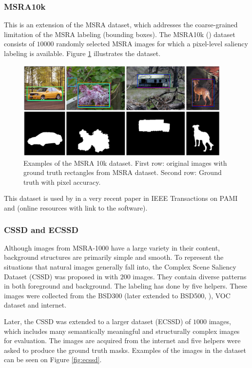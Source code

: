 \subsubsection{MSRA10k}
This is an extension of the MSRA dataset, which  addresses the coarse-grained limitation of the MSRA labeling (bounding boxes). The MSRA10k (\cite{msra10k_db}) dataset consists of $10000$ randomly selected MSRA images for which a pixel-level saliency labeling is available. Figure \ref{fig:msra10k} illustrates the dataset. 
\begin{figure}[H]
\begin{center}
\includegraphics[width=0.95\textwidth]{fig/MSRA10k}
\end{center}
\caption{Examples of the MSRA 10k dataset. First row: original images with ground truth rectangles from MSRA dataset. Second row: Ground truth with pixel accuracy.}
\label{fig:msra10k}
\end{figure}
This dataset is used by in a very recent paper in IEEE Transactions on PAMI \cite{ChengPAMI2015} and \cite{chengPAMIUrl} (online resources with link to the software). 

\subsubsection{CSSD and ECSSD}\label{subsec:cssd}
Although images from MSRA-1000 \cite{LCAV-CONF-2009-012} have a large variety in their content, background structures are primarily simple and smooth. To represent the situations that natural images generally fall into, the Complex Scene Saliency Dataset (CSSD) \cite{cssd_db} was proposed in \cite{YanCVPR2013} with $200$ images. They contain diverse patterns in both foreground and background. The labeling has done by five  helpers. These images were collected from the BSD300 (later extended to BSD500, \cite{bsd300/500_db}), VOC dataset \cite{voc_db} and internet.

Later, the CSSD was extended to a larger dataset (ECSSD) of $1000$ images, which includes many semantically meaningful and structurally complex images for evaluation. The images are acquired from the internet and five helpers were asked to produce the ground truth masks. Examples of the images in the dataset can be seen on Figure \ref{fig:ecssd}.

